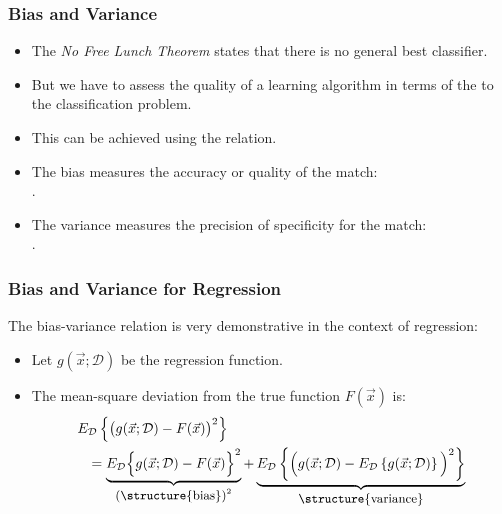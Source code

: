 \begin{frame}
  \frametitle{Bias and Variance}

  \begin{itemize}
    \item The \emph{No Free Lunch Theorem} states that there is no general best classifier. \pause
    \item But we have to assess the quality of a learning algorithm in terms of the  to the classification problem. \pause
    \item This can be achieved using the  relation.
  \end{itemize}
  \pspread


  \begin{itemize}
    \item The bias measures the accuracy or quality of the match: \\
      .
  \end{itemize}
  \pspread

  
  \begin{itemize}
    \item The variance measures the precision of specificity for the match: \\
      .
  \end{itemize}
\end{frame}


\begin{frame}
  \frametitle{Bias and Variance for Regression}

  The bias-variance relation is very demonstrative in the context of regression:
  
  \begin{itemize}
    \item Let $g(\vec x ; {\mathcal{D}})$ be the regression function. \pause
    \item The mean-square deviation from the true function $F(\vec x)$ is:
      \begin{eqnarray*}
         \lefteqn{E_{\mathcal{D}} \left\{ \big(g(\vec x; {\mathcal{D}}) - F(\vec x)\big)^2 \right\}} \\
         & & = \underbrace{E_{\mathcal{D}} \Big\{g(\vec x ; {\mathcal{D}}) - F(\vec x) \Big\}^2}_{\mbox{\small (\structure{bias})}^2} + 
               \underbrace{E_{\mathcal{D}} \left\{ \Big(g(\vec x; {\mathcal{D}}) - E_{\mathcal{D}} \left\{ g(\vec x; {\mathcal{D}} ) \right\} \Big)^2 \right\}}_{\mbox{\small \structure{variance}}}
      \end{eqnarray*}
  \end{itemize}
\end{frame}


